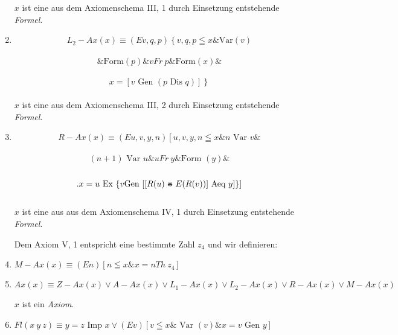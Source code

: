 \documentclass[draft]{scrartcl}
\begin{document}
\begin{enumerate}[1.]
	$x$ ist eine aus dem Axiomenschema III, 1 durch Einsetzung entstehende \textit{Formel}.

	\item $$
		L_2 - Ax\left(x\right) \equiv \left(Ev, q, p\right) \left\{v, q, p \leqq x \& \text{Var}\left(v\right)\right.
	$$\\[\spacebetweenbreakedequations]
	$$
		\left.\& \text{Form}\left(p\right) \& v Fr\ p \& \text{Form}\left(x\right) \&\right.
	$$\\[\spacebetweenbreakedequations]
	$$ 
		\left.x = \left[v \text{ Gen } \left(p\text{ Dis } q\right)\right]\right\}
	$$\\[\spaceafterbreakedequation]
	$x$ ist eine aus dem Axiomenschema III, 2 durch Einsetzung entstehende \textit{Formel}.

	\item $$
		R - Ax\left(x\right) \equiv \left(Eu, v, y, n\right) \left[u, v, y, n \leqq x \& n \text{ Var } v \& \right.
	$$\\[\spacebetweenbreakedequations]
	$$
		\left(n + 1\right) \text{ Var } u \&  u Fr\ y \& \text{Form }\left(y\right) \& 
	$$\\[\spacebetweenbreakedequations]
	$$
		\left.x = u\text{ Ex } \left\{v \text{Gen } \left[\left[R\left(u\right) \pmstar E\left(R\left(v\right)\right)\right] \text{ Aeq } y \right]\right\} \right]
	$$\\[\spaceafterbreakedequation]

	$x$ ist eine aus aus dem Axiomenschema IV, 1 durch
	Einsetzung entstehende \textit{Formel}.

	Dem Axiom V, 1 entspricht eine bestimmte Zahl $z_4$ und wir definieren:

	\item $M - Ax\left(x\right) \equiv \left(En\right) \left[n \leqq x \& x = n Th\ z_4\right]$%

	\item $Ax\left(x\right) \equiv Z - Ax\left(x\right) \lor A - Ax\left(x\right) \lor L_1 - Ax\left(x\right) \lor L_2 - Ax\left(x\right) \lor R - Ax\left(x\right) \lor M - Ax\left(x\right)$

	$x$ ist ein \textit{Axiom}.

	\item $Fl\left(x\ y\ z\right) \equiv y = z \text{ Imp } x \lor \left(Ev\right) \left[ v \leqq x \& \text{ Var }\left(v\right) \& x = v \text{ Gen } y\right]$


\end{enumerate}
\end{document}
